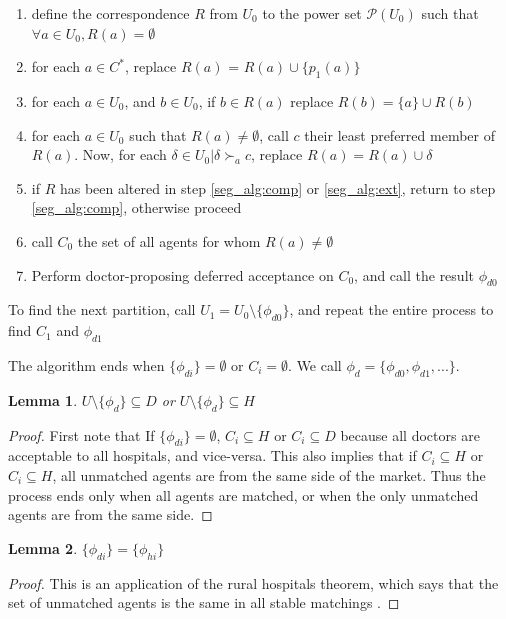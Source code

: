 \documentclass[WP]{AEA}
\newtheorem{lemma}{Lemma}
\begin{document}
\begin{enumerate}
	\item define the correspondence $R$ from $U_0$ to the power set $\mathcal{P}(U_0)$ such that $\forall a \in U_0, R(a) = \emptyset$
	\item for each $a \in C^*$, replace $R(a)$ =  $R(a) \cup \{p_1(a)\}$
	\item  \label{seg_alg:comp} for each $a \in U_0$, and $b \in U_0$, if $ b \in R(a)$ replace $R(b) = \{a\} \cup R(b)$
	\item  \label{seg_alg:ext} for each $a \in U_0$ such that $R(a) \neq \emptyset$, call  $c$ their least preferred member of $R(a)$. Now, for each $\delta \in U_0 | \delta \succ_a c$, replace $R(a) = R(a) \cup \delta$ 
	\item if $R$ has been altered in step \ref*{seg_alg:comp} or \ref*{seg_alg:ext}, return to step \ref*{seg_alg:comp}, otherwise proceed
	\item call $C_0$ the set of all agents for whom $R(a) \neq \emptyset$
	\item Perform doctor-proposing deferred acceptance on $C_0$, and call the result $\phi_{d0}$
\end{enumerate}

To find the next partition, call $U_1 = U_0 \setminus \{\phi_{d0}\}$, and repeat the entire process to find $C_1$ and $\phi_{d1}$

The algorithm ends when $\{\phi_{di}\} = \emptyset$ or $C_i= \emptyset$.  We call $\phi_d = \{\phi_{d0}, \phi_{d1}, ...\}$.

\begin{lemma}
	$ U \setminus \{\phi_{d}\} \subseteq D$ or $ U \setminus \{\phi_{d}\} \subseteq H$ 
\end{lemma}

\begin{proof}
	First note that If $\{\phi_{di}\} = \emptyset$, $C_i \subseteq H$ or $C_i \subseteq D$ because all doctors are acceptable to all hospitals, and vice-versa. This also implies that if $C_i \subseteq H$ or $C_i \subseteq H$, all unmatched agents are from the same side of the market.  Thus the process ends only when all agents are matched, or when the only unmatched agents are from the same side.
\end{proof}

\begin{lemma}
	$\{\phi_{di}\}=\{\phi_{hi}\}$
\end{lemma}
\begin{proof}
	This is an application of the rural hospitals theorem, which says that the set of unmatched agents is the same in all stable matchings \cite{Roth1986}.
\end{proof}
\end{document}
